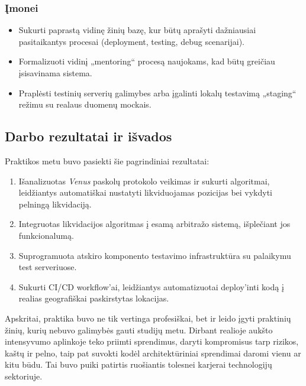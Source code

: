 \documentclass[]{VUMIFTemplateClass}
\begin{document}
\subsubsection{Įmonei}

\begin{itemize}
    \item Sukurti paprastą vidinę žinių bazę, kur būtų aprašyti dažniausiai pasitaikantys procesai (deployment, testing, debug scenarijai).
    \item Formalizuoti vidinį „mentoring“ procesą naujokams, kad būtų greičiau įsisavinama sistema.
    \item Praplėsti testinių serverių galimybes arba įgalinti lokalų testavimą „staging“ režimu su realaus duomenų mockais.
\end{itemize}

\subsection{Darbo rezultatai ir išvados}

Praktikos metu buvo pasiekti šie pagrindiniai rezultatai:

\begin{enumerate}
    \item Išanalizuotas \textit{Venus} paskolų protokolo veikimas ir sukurti algoritmai, leidžiantys automatiškai nustatyti likviduojamas pozicijas bei vykdyti pelningą likvidaciją.
    \item Integruotas likvidacijos algoritmas į esamą arbitražo sistemą, išplečiant jos funkcionalumą.
    \item Suprogramuota atskiro komponento testavimo infrastruktūra su palaikymu test serveriuose.
    \item Sukurti CI/CD workflow’ai, leidžiantys automatizuotai deploy’inti kodą į realias geografiškai paskirstytas lokacijas.
\end{enumerate}

Apskritai, praktika buvo ne tik vertinga profesiškai, bet ir leido įgyti praktinių žinių, kurių nebuvo galimybės gauti studijų metu. Dirbant realioje aukšto intensyvumo aplinkoje teko priimti sprendimus, daryti kompromisus tarp rizikos, kaštų ir pelno, taip pat suvokti kodėl architektūriniai sprendimai daromi vienu ar kitu būdu. Tai buvo puiki patirtis ruošiantis tolesnei karjerai technologijų sektoriuje.
\end{document}
